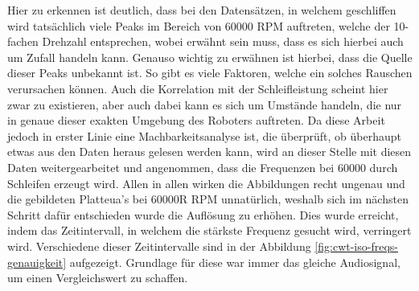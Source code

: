 Hier zu erkennen ist deutlich, dass bei den Datensätzen, in welchem geschliffen wird tatsächlich viele Peaks im Bereich von 60000 RPM auftreten, welche der 10-fachen Drehzahl entsprechen, wobei erwähnt sein muss, dass es sich hierbei auch um Zufall handeln kann. Genauso wichtig zu erwähnen ist hierbei, dass die Quelle dieser Peaks unbekannt ist. So gibt es viele Faktoren, welche ein solches Rauschen verursachen können. Auch die Korrelation mit der Schleifleistung scheint hier zwar zu existieren, aber auch dabei kann es sich um Umstände handeln, die nur in genaue dieser exakten Umgebung des Roboters auftreten. Da diese Arbeit jedoch in erster Linie eine Machbarkeitsanalyse ist, die überprüft, ob überhaupt etwas aus den Daten heraus gelesen werden kann, wird an dieser Stelle mit diesen Daten weitergearbeitet und angenommen, dass die Frequenzen bei 60000 durch Schleifen erzeugt wird. Allen in allen wirken die Abbildungen recht ungenau und die gebildeten Platteua's bei 60000R RPM unnatürlich, weshalb sich im nächsten Schritt dafür entschieden wurde die Auflösung zu erhöhen. Dies wurde erreicht, indem das Zeitintervall, in welchem die stärkste Frequenz gesucht wird, verringert wird. Verschiedene dieser Zeitintervalle sind in der Abbildung \ref{fig:cwt-iso-freqs-genauigkeit} aufgezeigt. Grundlage für diese war immer das gleiche Audiosignal, um einen Vergleichswert zu schaffen.


